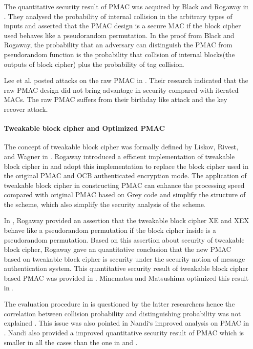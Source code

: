 \documentclass{article}
\begin{document}
The quantitative security result of PMAC was acquired by Black and Rogaway in \cite{pmac}. They analysed the probability of internal collision in the arbitrary types of inputs and asserted that the PMAC design is a secure MAC if the block cipher used behaves like a pseudorandom permutation. In the proof from Black and Rogaway, the probability that an adversary can distinguish the PMAC from pseudorandom function is the probability that collision of internal blocks(the outputs of block cipher) plus the probability of tag collision. 

Lee et al. posted attacks on the raw PMAC in \cite{pmac_forgery}. Their research indicated that the raw PMAC design did not bring advantage in security compared with iterated MACs. The raw PMAC suffers from their birthday like attack and the key recover attack.
 
\paragraph{Tweakable block cipher and Optimized PMAC}
The concept of tweakable block cipher was formally defined by Liskov, Rivest, and Wagner in \cite{tweak}. Rogaway introduced a efficient implementation of tweakable block cipher in \cite{tweak_pmac}and adopt this implementation to replace the block cipher used in the original PMAC and OCB authenticated encryption mode.
The application of tweakable block cipher in constructing PMAC can enhance the processing speed compared with original PMAC based on Grey code and simplify the structure of the scheme, which also simplify the security analysis of the scheme. 

In \cite{tweak_pmac}, Rogaway provided an assertion that the tweakable block cipher XE and XEX behave like a pseudorandom permutation if the block cipher inside is a pseudorandom permutation. Based on this assertion about security of tweakable block cipher, Rogaway gave an quantitative conclusion that the new PMAC based on tweakable block cipher is security under the security notion of message authentication system. This quantitative security result of tweakable block cipher based PMAC was provided in \cite{tweak_pmac}.
Minematsu and Matsushima optimized this result in \cite{new}. 

The evaluation procedure in \cite{pmac} is questioned by the latter researchers hence the correlation between collision probability and 
distinguishing probability was not explained . This issue was also pointed in Nandi`s improved analysis on PMAC in \cite{improve_pmac}. Nandi also provided a improved quantitative security result of PMAC which is smaller in all the cases than the one in \cite{pmac} and \cite{new}. 
\end{document}
